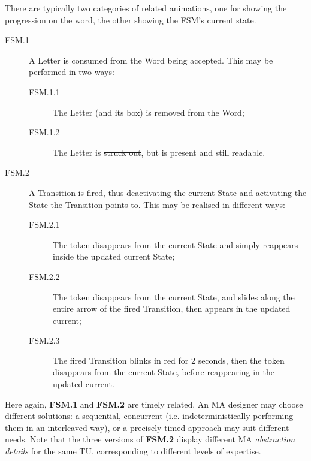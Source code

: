 There are typically two categories of related animations, one for showing the 
progression on the word, the other showing the FSM's current state. 
\begin{description}
   \item[FSM.1] A \textsf{Letter} is consumed from the \textsf{Word} being 
   accepted. This may be performed in two ways:
   \begin{description}
      \item[FSM.1.1] The \textsf{Letter} (and its box) is removed from the \textsf{Word};
      \item[FSM.1.2] The \textsf{Letter} is \st{struck out}, but is present and still readable.
   \end{description}
   \item[FSM.2] A \textsf{Transition} is fired, thus deactivating the current
   \textsf{State} and activating the \textsf{State} the \textsf{Transition} points to.
   This may be realised in different ways:
   \begin{description}
      \item[FSM.2.1] The token disappears from the \textsf{current} \textsf{State}
      and simply reappears inside the updated \textsf{current} \textsf{State}; 
      \item[FSM.2.2] The token disappears from the \textsf{current} \textsf{State},
      and slides along the entire arrow of the fired \textsf{Transition}, then 
      appears in the updated \textsf{current};
      \item[FSM.2.3] The fired \textsf{Transition} blinks in red for 2 seconds,
      then the token disappears from the \textsf{current} \textsf{State},
      before reappearing in the updated \textsf{current}.
   \end{description}
\end{description}
Here again, \textbf{FSM.1} and \textbf{FSM.2} are timely related. 
An MA designer may choose different solutions: a sequential, concurrent (i.e.
indeterministically performing them in an interleaved way), or a precisely timed
approach may suit different needs. Note that the three versions of \textbf{FSM.2}
display different MA \emph{abstraction details} for the same TU, corresponding to
different levels of expertise.

